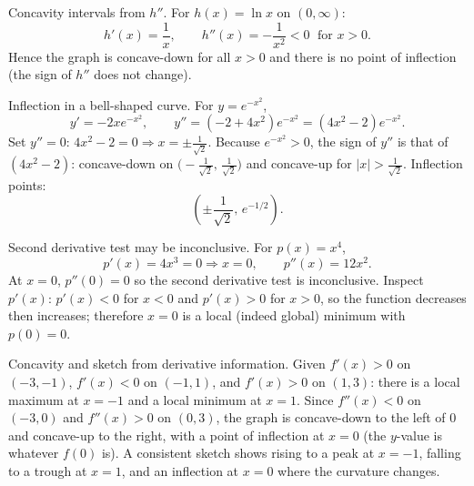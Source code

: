 \documentclass[11pt]{article}
\def\textbf#1{#1}%
\begin{document}
\begin{solution}
\textbf{Concavity intervals from $h''$.} For $h(x)=\ln x$ on $(0,\infty)$:
\[
h'(x)=\frac{1}{x},\qquad h''(x)=-\frac{1}{x^{2}}<0 \;\text{ for } x>0.
\]
Hence the graph is concave-down for all $x>0$ and there is no point of inflection (the sign of $h''$ does not change).
\end{solution}

\begin{solution}
\textbf{Inflection in a bell-shaped curve.} For $y=e^{-x^{2}}$,
\[
y'=-2xe^{-x^{2}},\qquad
y''=(-2+4x^{2})e^{-x^{2}}=(4x^{2}-2)e^{-x^{2}}.
\]
Set $y''=0$: $4x^{2}-2=0\Rightarrow x=\pm\frac{1}{\sqrt{2}}$.
Because $e^{-x^{2}}>0$, the sign of $y''$ is that of $(4x^{2}-2)$:
concave-down on $\big(-\tfrac{1}{\sqrt{2}},\,\tfrac{1}{\sqrt{2}}\big)$ and concave-up for $|x|>\tfrac{1}{\sqrt{2}}$.
Inflection points:
\[
\left(\pm\frac{1}{\sqrt{2}},\,e^{-1/2}\right).
\]
\end{solution}

\begin{solution}
\textbf{Second derivative test may be inconclusive.} For $p(x)=x^{4}$,
\[
p'(x)=4x^{3}=0 \Rightarrow x=0,\qquad p''(x)=12x^{2}.
\]
At $x=0$, $p''(0)=0$ so the second derivative test is inconclusive.
Inspect $p'(x)$: $p'(x)<0$ for $x<0$ and $p'(x)>0$ for $x>0$, so the function decreases then increases; therefore $x=0$ is a local (indeed global) minimum with $p(0)=0$.
\end{solution}

\begin{solution}
\textbf{Concavity and sketch from derivative information.}
Given $f'(x)>0$ on $(-3,-1)$, $f'(x)<0$ on $(-1,1)$, and $f'(x)>0$ on $(1,3)$:
there is a local maximum at $x=-1$ and a local minimum at $x=1$.
Since $f''(x)<0$ on $(-3,0)$ and $f''(x)>0$ on $(0,3)$, the graph is concave-down to the left of $0$ and concave-up to the right, with a point of inflection at $x=0$ (the $y$-value is whatever $f(0)$ is).
A consistent sketch shows rising to a peak at $x=-1$, falling to a trough at $x=1$, and an inflection at $x=0$ where the curvature changes.
\end{solution}
\end{document}
